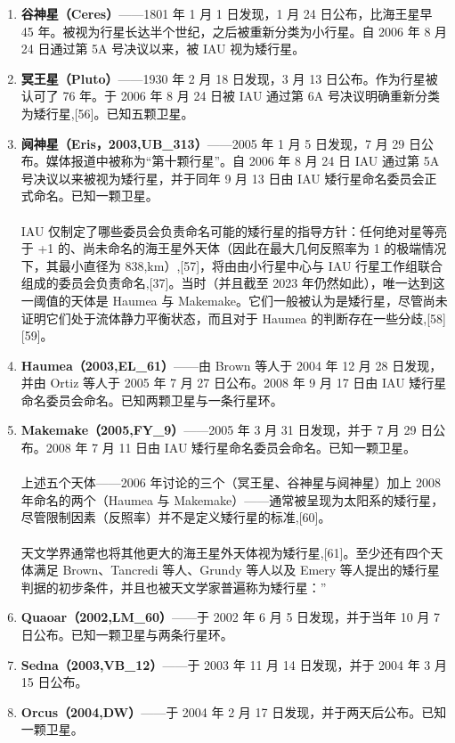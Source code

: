\begin{enumerate}
\item \textbf{谷神星（Ceres）}——1801 年 1 月 1 日发现，1 月 24 日公布，比海王星早 45 年。被视为行星长达半个世纪，之后被重新分类为小行星。自 2006 年 8 月 24 日通过第 5A 号决议以来，被 IAU 视为矮行星。
\item \textbf{冥王星（Pluto）}——1930 年 2 月 18 日发现，3 月 13 日公布。作为行星被认可了 76 年。于 2006 年 8 月 24 日被 IAU 通过第 6A 号决议明确重新分类为矮行星,[56]。已知五颗卫星。
\item \textbf{阋神星（Eris，2003,UB_{313}）}——2005 年 1 月 5 日发现，7 月 29 日公布。媒体报道中被称为“第十颗行星”。自 2006 年 8 月 24 日 IAU 通过第 5A 号决议以来被视为矮行星，并于同年 9 月 13 日由 IAU 矮行星命名委员会正式命名。已知一颗卫星。\\\\
IAU 仅制定了哪些委员会负责命名可能的矮行星的指导方针：任何绝对星等亮于 +1 的、尚未命名的海王星外天体（因此在最大几何反照率为 1 的极端情况下，其最小直径为 838,km）,[57]，将由由小行星中心与 IAU 行星工作组联合组成的委员会负责命名,[37]。当时（并且截至 2023 年仍然如此），唯一达到这一阈值的天体是 Haumea 与 Makemake。它们一般被认为是矮行星，尽管尚未证明它们处于流体静力平衡状态，而且对于 Haumea 的判断存在一些分歧,[58][59]。
\item \textbf{Haumea（2003,EL_{61}）}——由 Brown 等人于 2004 年 12 月 28 日发现，并由 Ortiz 等人于 2005 年 7 月 27 日公布。2008 年 9 月 17 日由 IAU 矮行星命名委员会命名。已知两颗卫星与一条行星环。
\item \textbf{Makemake（2005,FY_{9}）}——2005 年 3 月 31 日发现，并于 7 月 29 日公布。2008 年 7 月 11 日由 IAU 矮行星命名委员会命名。已知一颗卫星。\\\\
上述五个天体——2006 年讨论的三个（冥王星、谷神星与阋神星）加上 2008 年命名的两个（Haumea 与 Makemake）——通常被呈现为太阳系的矮行星，尽管限制因素（反照率）并不是定义矮行星的标准,[60]。\\\\
天文学界通常也将其他更大的海王星外天体视为矮行星,[61]。至少还有四个天体满足 Brown、Tancredi 等人、Grundy 等人以及 Emery 等人提出的矮行星判据的初步条件，并且也被天文学家普遍称为矮行星：”
\item \textbf{Quaoar（2002,LM_{60}）}——于 2002 年 6 月 5 日发现，并于当年 10 月 7 日公布。已知一颗卫星与两条行星环。
\item \textbf{Sedna（2003,VB_{12}）}——于 2003 年 11 月 14 日发现，并于 2004 年 3 月 15 日公布。
\item \textbf{Orcus（2004,DW）}——于 2004 年 2 月 17 日发现，并于两天后公布。已知一颗卫星。

\end{enumerate}
